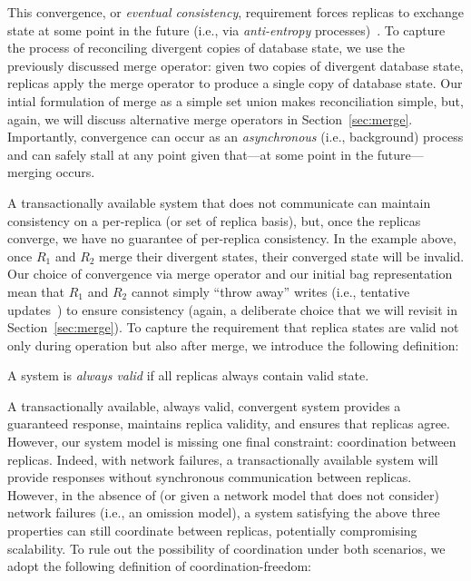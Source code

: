 This convergence, or \textit{eventual consistency}, requirement forces
replicas to exchange state at some point in the future (i.e., via
\textit{anti-entropy} processes)~\cite{vogels-defs}. To capture the
process of reconciling divergent copies of database state, we use the
previously discussed merge operator: given two copies of divergent
database state, replicas apply the merge operator to produce a single
copy of database state. Our intial formulation of merge as a simple
set union makes reconciliation simple, but, again, we will discuss
alternative merge operators in Section~\ref{sec:merge}. Importantly,
convergence can occur as an \textit{asynchronous} (i.e., background)
process and can safely stall at any point given that---at some point
in the future---merging occurs.

 A transactionally available system
that does not communicate can maintain consistency on a per-replica
(or set of replica basis), but, once the replicas converge, we have no
guarantee of per-replica consistency. In the example above, once $R_1$
and $R_2$ merge their divergent states, their converged state will be
invalid. Our choice of convergence via merge operator and our initial
bag representation mean that $R_1$ and $R_2$ cannot simply ``throw
away'' writes (i.e., tentative updates~\cite{tamer-book}) to ensure
consistency (again, a deliberate choice that we will revisit in
Section~\ref{sec:merge}). To capture the requirement that replica
states are valid not only during operation but also after merge, we
introduce the following definition:

\begin{definition}
A system is \textit{always valid} if all replicas always contain valid
state.
\end{definition}

 A transactionally available, always valid,
convergent system provides a guaranteed response, maintains replica
validity, and ensures that replicas agree. However, our system model
is missing one final constraint: coordination between
replicas. Indeed, with network failures, a transactionally available
system will provide responses without synchronous communication
between replicas. However, in the absence of (or given a network model
that does not consider) network failures (i.e., an omission model), a
system satisfying the above three properties can still coordinate
between replicas, potentially compromising scalability. To rule out
the possibility of coordination under both scenarios, we adopt the
following definition of coordination-freedom:

